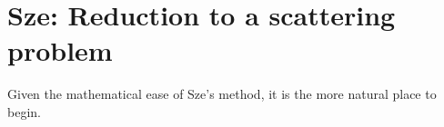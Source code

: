 \section{Sze: Reduction to a scattering problem}
Given the mathematical ease of Sze's method, it is the more natural place to begin.